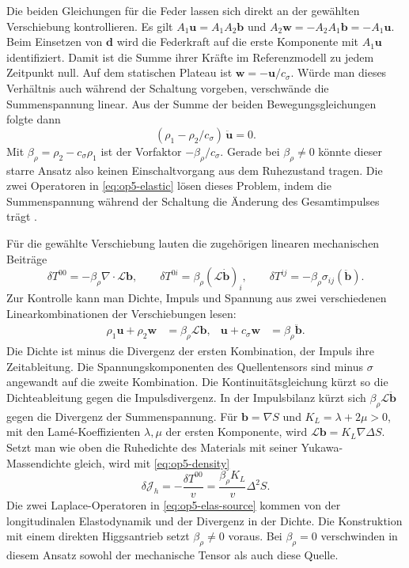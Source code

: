 Die beiden Gleichungen für die Feder lassen sich direkt an der gewählten Verschiebung kontrollieren. Es gilt \(A_1\mathbf u=A_1A_2\mathbf b\) und \(A_2\mathbf w=-A_2A_1\mathbf b=-A_1\mathbf u\). Beim Einsetzen von \(\mathbf d\) wird die Federkraft auf die erste Komponente mit \(A_1\mathbf u\) identifiziert. Damit ist die Summe ihrer Kräfte im Referenzmodell zu jedem Zeitpunkt null. Auf dem statischen Plateau ist \(\mathbf w=-\mathbf u/c_\sigma\). Würde man dieses Verhältnis auch während der Schaltung vorgeben, verschwände die Summenspannung linear. Aus der Summe der beiden Bewegungsgleichungen folgte dann
\[
 (\rho_1-\rho_2/c_\sigma)\,\ddot{\mathbf u}=0.
\]
Mit \(\beta_\rho=\rho_2-c_\sigma\rho_1\) ist der Vorfaktor \(-\beta_\rho/c_\sigma\). Gerade bei \(\beta_\rho\ne0\) könnte dieser starre Ansatz also keinen Einschaltvorgang aus dem Ruhezustand tragen. Die zwei Operatoren in \eqref{eq:op5-elastic} lösen dieses Problem, indem die Summenspannung während der Schaltung die Änderung des Gesamtimpulses trägt \cite{op5-motion}.

Für die gewählte Verschiebung lauten die zugehörigen linearen mechanischen Beiträge
\begin{equation}
 \delta T^{00}=-\beta_\rho\nabla\cdot\mathcal L\mathbf b,\qquad
 \delta T^{0i}=\beta_\rho(\mathcal L\dot{\mathbf b})_i,\qquad
 \delta T^{ij}=-\beta_\rho\sigma_{ij}(\ddot{\mathbf b}) .
 \label{eq:op5-tensor}
\end{equation}
Zur Kontrolle kann man Dichte, Impuls und Spannung aus zwei verschiedenen Linearkombinationen der Verschiebungen lesen:
\begin{align}
 \rho_1\mathbf u+\rho_2\mathbf w
    &=\beta_\rho\mathcal L\mathbf b,
 &
 \mathbf u+c_\sigma\mathbf w&=\beta_\rho\ddot{\mathbf b}.
 \label{eq:op5-sum-identities}
\end{align}
Die Dichte ist minus die Divergenz der ersten Kombination, der Impuls ihre Zeitableitung. Die Spannungskomponenten des Quellentensors sind minus \(\sigma\) angewandt auf die zweite Kombination. Die Kontinuitätsgleichung kürzt so die Dichteableitung gegen die Impulsdivergenz. In der Impulsbilanz kürzt sich \(\beta_\rho\mathcal L\ddot{\mathbf b}\) gegen die Divergenz der Summenspannung. Für \(\mathbf b=\nabla S\) und \(K_L=\lambda+2\mu>0\), mit den Lamé-Koeffizienten \(\lambda,\mu\) der ersten Komponente, wird \(\mathcal L\mathbf b=K_L\nabla\Delta S\). Setzt man wie oben die Ruhedichte des Materials mit seiner Yukawa-Massendichte gleich, wird mit \eqref{eq:op5-density}
\begin{equation}
 \delta\mathcal J_h=-\frac{\delta T^{00}}{v}
                  =\frac{\beta_\rho K_L}{v}\Delta^2 S .
 \label{eq:op5-elas-source}
\end{equation}
Die zwei Laplace-Operatoren in \eqref{eq:op5-elas-source} kommen von der longitudinalen Elastodynamik und der Divergenz in der Dichte. Die Konstruktion mit einem direkten Higgsantrieb setzt \(\beta_\rho\ne0\) voraus. Bei \(\beta_\rho=0\) verschwinden in diesem Ansatz sowohl der mechanische Tensor als auch diese Quelle.

